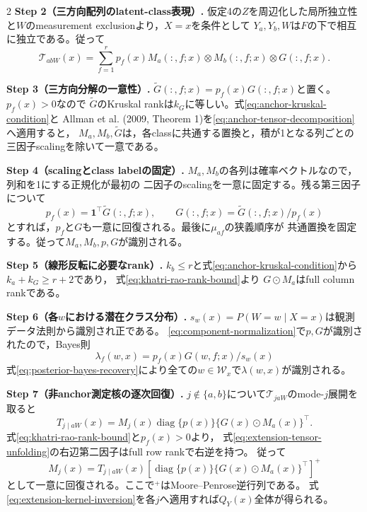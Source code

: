 \documentclass[a4paper,10pt]{article}
\newcommand{\one}{\bm 1}
\begin{document}
\begin{multicols}{2}
\noindent\textbf{Step 2（三方向配列のlatent-class表現）.}
仮定4の$Z$を周辺化した局所独立性と$W$のmeasurement exclusionより，$X=x$を条件として
$Y_a,Y_b,W$は$F$の下で相互に独立である。従って
\begin{equation}
\mathcal T_{abW}(x)
=\sum_{f=1}^r p_f(x)M_a(:,f;x)\otimes M_b(:,f;x)\otimes G(:,f;x).
\label{eq:anchor-tensor-decomposition}
\end{equation}

\noindent\textbf{Step 3（三方向分解の一意性）.}
$\widetilde G(:,f;x)=p_f(x)G(:,f;x)$と置く。$p_f(x)>0$なので
$\widetilde G$のKruskal rankは$k_G$に等しい。式\eqref{eq:anchor-kruskal-condition}と
Allman et al. (2009, Theorem 1)を\eqref{eq:anchor-tensor-decomposition}へ適用すると，
$M_a,M_b,\widetilde G$は，各classに共通する置換と，積が1となる列ごとの
三因子scalingを除いて一意である。

\noindent\textbf{Step 4（scalingとclass labelの固定）.}
$M_a,M_b$の各列は確率ベクトルなので，列和を1にする正規化が最初の
二因子のscalingを一意に固定する。残る第三因子について
\begin{equation}
p_f(x)=\one^\top\widetilde G(:,f;x),\qquad
G(:,f;x)=\widetilde G(:,f;x)/p_f(x)
\label{eq:component-normalization}
\end{equation}
とすれば，$p_f$と$G$も一意に回復される。最後に$\mu_{af}$の狭義順序が
共通置換を固定する。従って$M_a,M_b,p,G$が識別される。

\noindent\textbf{Step 5（線形反転に必要なrank）.}
$k_b\le r$と式\eqref{eq:anchor-kruskal-condition}から$k_a+k_G\ge r+2$であり，
式\eqref{eq:khatri-rao-rank-bound}より
$G\odot M_a$はfull column rankである。

\noindent\textbf{Step 6（各$w$における潜在クラス分布）.}
$s_w(x)=P(W=w\mid X=x)$は観測データ法則から識別され正である。
\eqref{eq:component-normalization}で$p,G$が識別されたので，Bayes則
\begin{equation}
\lambda_f(w,x)=p_f(x)G(w,f;x)/s_w(x)
\label{eq:posterior-bayes-recovery}
\end{equation}
式\eqref{eq:posterior-bayes-recovery}により全ての$w\in\mathcal W_x$で$\lambda(w,x)$が識別される。

\noindent\textbf{Step 7（非anchor測定核の逐次回復）.}
$j\notin\{a,b\}$について$\mathcal T_{jaW}$のmode-$j$展開を取ると
\begin{equation}
T_{j\mid aW}(x)
=M_j(x)\operatorname{diag}\{p(x)\}
\{G(x)\odot M_a(x)\}^\top.
\label{eq:extension-tensor-unfolding}
\end{equation}
式\eqref{eq:khatri-rao-rank-bound}と$p_f(x)>0$より，
式\eqref{eq:extension-tensor-unfolding}の右辺第二因子はfull row rankで右逆を持つ。
従って
\begin{equation}
M_j(x)=T_{j\mid aW}(x)
\left[\operatorname{diag}\{p(x)\}
\{G(x)\odot M_a(x)\}^\top\right]^+
\label{eq:extension-kernel-inversion}
\end{equation}
として一意に回復される。ここで$^+$はMoore--Penrose逆行列である。
式\eqref{eq:extension-kernel-inversion}を各$j$へ適用すれば$Q_Y(x)$全体が得られる。


\end{multicols}
\end{document}
